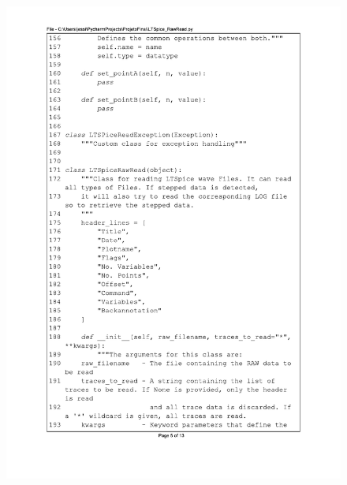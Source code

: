 \begin{figure}[]
\centering
\includegraphics[scale=0.9]{01_Pre_textuais/code/leitura5.pdf}
\end{figure}

